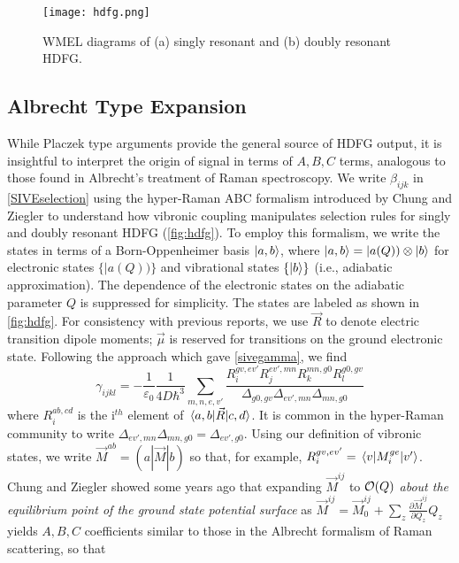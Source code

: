 \documentclass[aip, jcp, reprint, onecolumn]{revtex4-2}
\begin{document}
\begin{figure}[!htbp]
	\centering
	\texttt{[image: hdfg.png]}
	\caption{WMEL diagrams of (a) singly resonant and (b) doubly resonant HDFG. 
	}
	\label{fig:hdfg}
\end{figure}
\subsection{Albrecht Type Expansion}
While Placzek type arguments provide the general source of HDFG output, it is insightful to interpret the origin of signal in terms of $A,B,C$ terms, analogous to those found in Albrecht's treatment of Raman spectroscopy.\cite{Albrecht1961, Ziegler1988} 
We write $\beta_{ijk}$ in \autoref{SIVEselection} using the hyper-Raman ABC formalism introduced by Chung and Ziegler to understand how vibronic coupling manipulates selection rules for singly and doubly resonant HDFG (\autoref{fig:hdfg}). \cite{Ziegler1988}
To employ this formalism, we write the states in terms of a Born-Oppenheimer basis $\ket{a,b}$, where $\ket{a,b} = |a(Q)) \otimes \ket{b}$ for electronic states $\{|a(Q))\}$ and vibrational states $\{\ket{b}\}$ (i.e., adiabatic approximation). \cite{BornOppenheimer, Tang1970}
The dependence of the electronic states on the adiabatic parameter $Q$ is suppressed for simplicity.
The states are labeled as shown in \autoref{fig:hdfg}.
For consistency with previous reports, we use $\vec{R}$ to denote electric transition dipole moments; $\vec{\mu}$ is reserved for transitions on the ground electronic state. \cite{Tang1970}
Following the approach which gave \autoref{sivegamma}, we find
\begin{equation}\label{drgamma_notaylor}
	\gamma_{ijkl} = -\frac{1}{\varepsilon_0} \frac{1}{4D \hbar^3} \sum_{m,n,e,v'} \frac{
		R_{i}^{gv, ev'} 
		R_{j}^{ev',mn} 
		R_{k}^{mn,g0} 
		R_{l}^{g0,gv} 
	}{\Delta_{g0,gv}
		\Delta_{ev', mn}
		\Delta_{mn, g0}
	}
\end{equation}
where $R_{i}^{ab,cd}$ is the i$^{th}$ element of $\mel{a,b}{\vec{R}}{c,d}$.
It is common in the hyper-Raman community to write $\Delta_{ev', mn} \Delta_{mn, g0} = \Delta_{ev', g0}$.
Using our definition of vibronic states, we write $\vec{M}^{ab} = (a|\vec{M}|b)$ so that, for example,
$R_{i}^{gv,ev'} = \mel{v}{M_i^{ge}}{v'}$.
Chung and Ziegler showed some years ago that expanding $\vec{M}^{ij}$ to $\order{Q}$ \textit{about the equilibrium point of the ground state potential surface} as
$\vec{M}^{ij} = \vec{M}^{ij}_0 + \sum_z \frac{\partial\vec{M}^{ij}}{\partial Q_z} Q_z$
yields $A, B, C$ coefficients similar to those in the Albrecht formalism of Raman scattering, \cite{Albrecht1961, Ziegler1988} so that
\end{document}
